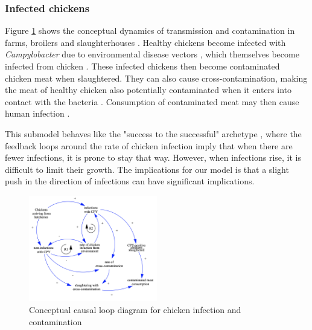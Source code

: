 

\subsubsection*{Infected chickens}
Figure \ref{fig:transmission_submodel} shows the conceptual dynamics of transmission and contamination in farms, broilers and slaughterhouses \parencite{rommens_infected_2020}. Healthy chickens become infected with \textit{Campylobacter} due to environmental disease vectors \parencite{royden_role_2016}, which themselves become infected from chicken \parencite{skovgard_retention_2011}. These infected chickens then become contaminated chicken meat when slaughtered. They can also cause cross-contamination, making the meat of healthy chicken also potentially contaminated when it enters into contact with the bacteria \parencite{berndtson_campylobacter_1996}. Consumption of contaminated meat may then cause human infection \parencite{wilson_tracing_2008}.

This submodel behaves like the "success to the successful" archetype \parencite{pruyt_triple_2013}, where the feedback loops around the rate of chicken infection imply that when there are fewer infections, it is prone to stay that way. However, when infections rise, it is difficult to limit their growth. The implications for our model is that a slight push in the direction of infections can have significant implications.

\begin{figure}[h!]
\centering
\includegraphics[width=0.50\textwidth]{images/Transmission submodel.png}
\caption{Conceptual causal loop diagram for chicken infection and contamination}
\label{fig:transmission_submodel}
\end{figure}


